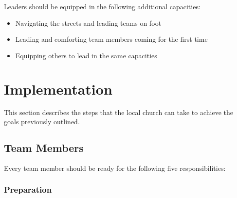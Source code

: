 \documentclass[12pt]{article}
\begin{document}
    Leaders should be equipped in the following additional capacities:
    \begin{itemize}
        \item Navigating the streets and leading teams on foot
        \item Leading and comforting team members coming for the first time
        \item Equipping others to lead in the same capacities
    \end{itemize}


\section{Implementation}

This section describes the steps that the local church can take to achieve the goals previously outlined.

\subsection{Team Members}

    Every team member should be ready for the following five responsibilities:

\subsubsection{Preparation}
\end{document}
